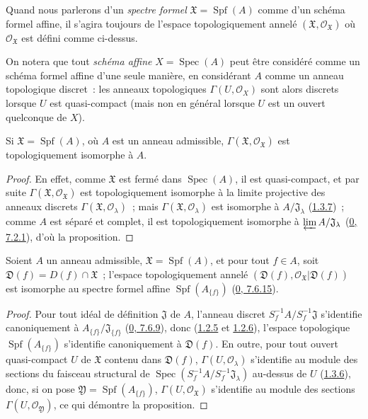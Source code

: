 Quand nous parlerons d'un \emph{spectre formel}
$\mathfrak{X}=\operatorname{Spf}(A)$ comme d'un schéma formel affine, il
s'agira toujours de l'espace topologiquement annelé
$(\mathfrak{X},\mathscr{O}_{\mathfrak{X}})$ où
$\mathscr{O}_{\mathfrak{X}}$ est défini comme ci-dessus.

On notera que tout \emph{schéma affine} $X=\operatorname{Spec}(A)$ peut être
considéré comme un schéma formel affine d'une seule manière, en considérant
$A$ comme un anneau topologique discret~: les anneaux topologiques
$\Gamma(U,\mathscr{O}_X)$ sont alors discrets lorsque $U$ est
quasi-compact (mais non en général lorsque $U$ est un ouvert quelconque de
$X$).

\begin{proposition}[10.1.3]
\label{I.10.1.3-fr}
Si $\mathfrak{X}=\operatorname{Spf}(A)$, où $A$ est un anneau admissible,
$\Gamma(\mathfrak{X},\mathscr{O}_{\mathfrak{X}})$ est topologiquement
isomorphe à $A$.
\end{proposition}

\begin{proof}
En effet, comme $\mathfrak{X}$ est fermé dans $\operatorname{Spec}(A)$, il
est quasi-compact, et par suite
$\Gamma(\mathfrak{X},\mathscr{O}_{\mathfrak{X}})$ est topologiquement
isomorphe à la limite projective des anneaux discrets
$\Gamma(\mathfrak{X},\mathscr{O}_\lambda)$~; mais
$\Gamma(\mathfrak{X},\mathscr{O}_\lambda)$ est isomorphe à
$A/\mathfrak{J}_\lambda$ (\hyperref[I.1.3.7-fr]{1.3.7})~; comme $A$ est
séparé et complet, il est topologiquement isomorphe à
$\varprojlim A/\mathfrak{J}_\lambda$
(\hyperref[0.7.2.1-fr]{0, 7.2.1}), d'où la proposition.
\end{proof}

\begin{proposition}[10.1.4]
\label{I.10.1.4-fr}
Soient $A$ un anneau admissible, $\mathfrak{X}=\operatorname{Spf}(A)$, et
pour tout $f\in A$, soit
$\mathfrak{D}(f)=D(f)\cap\mathfrak{X}$~; l'espace topologiquement annelé
$(\mathfrak{D}(f),\mathscr{O}_{\mathfrak{X}}|\mathfrak{D}(f))$ est
isomorphe au spectre formel affine
$\operatorname{Spf}(A_{\{f\}})$
(\hyperref[0.7.6.15-fr]{0, 7.6.15}).
\end{proposition}

\begin{proof}
Pour tout idéal de définition $\mathfrak{J}$ de $A$, l'anneau discret
$S_f^{-1}A/S_f^{-1}\mathfrak{J}$ s'identifie canoniquement à
$A_{\{f\}}/\mathfrak{J}_{\{f\}}$
(\hyperref[0.7.6.9-fr]{0, 7.6.9}), donc
(\hyperref[I.1.2.5-fr]{1.2.5} et \hyperref[I.1.2.6-fr]{1.2.6}), l'espace
topologique $\operatorname{Spf}(A_{\{f\}})$ s'identifie canoniquement à
$\mathfrak{D}(f)$. En outre, pour tout ouvert quasi-compact $U$ de
$\mathfrak{X}$ contenu dans $\mathfrak{D}(f)$,
$\Gamma(U,\mathscr{O}_\lambda)$ s'identifie au module des sections du
faisceau structural de
$\operatorname{Spec}(S_f^{-1}A/S_f^{-1}\mathfrak{J}_\lambda)$ au-dessus de
$U$ (\hyperref[I.1.3.6-fr]{1.3.6}), donc, si on pose
$\mathfrak{Y}=\operatorname{Spf}(A_{\{f\}})$,
$\Gamma(U,\mathscr{O}_{\mathfrak{X}})$ s'identifie au module des sections
$\Gamma(U,\mathscr{O}_{\mathfrak{Y}})$, ce qui démontre la proposition.
\end{proof}

